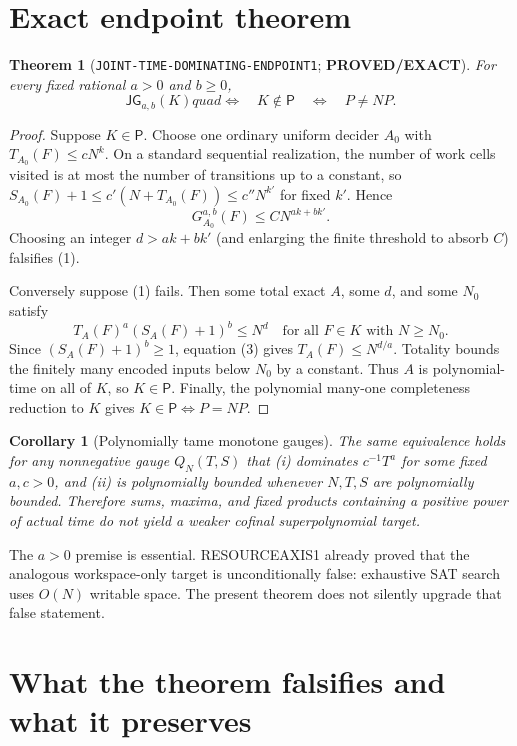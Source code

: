 \documentclass[11pt]{article}
\newtheorem{theorem}{Theorem}
\newtheorem{corollary}{Corollary}
\newcommand{\EXACT}{\textbf{PROVED/EXACT}}
\begin{document}
\section{Exact endpoint theorem}

\begin{theorem}[\texttt{JOINT-TIME-DOMINATING-ENDPOINT1}; \EXACT]
For every fixed rational $a>0$ and $b\ge0$,
\[
 \mathsf{JG}_{a,b}(K)quad\Longleftrightarrow\quad K\notin\mathsf P
 \quad\Longleftrightarrow\quad P\ne NP.                 \tag{2}
\]
\end{theorem}

\begin{proof}
Suppose $K\in\mathsf P$.  Choose one ordinary uniform decider $A_0$ with
$T_{A_0}(F)\le cN^k$.  On a standard sequential realization, the number of
work cells visited is at most the number of transitions up to a constant, so
$S_{A_0}(F)+1\le c'(N+T_{A_0}(F))\le c''N^{k'}$ for fixed $k'$.  Hence
\[
 G^{a,b}_{A_0}(F)\le C N^{ak+bk'}.
\]
Choosing an integer $d>ak+bk'$ (and enlarging the finite threshold to absorb
$C$) falsifies (1).

Conversely suppose (1) fails.  Then some total exact $A$, some $d$, and some
$N_0$ satisfy
\[
 T_A(F)^a(S_A(F)+1)^b\le N^d
 \quad\text{for all }F\in K\text{ with }N\ge N_0.       \tag{3}
\]
Since $(S_A(F)+1)^b\ge1$, equation (3) gives
$T_A(F)\le N^{d/a}$.  Totality bounds the finitely many encoded inputs below
$N_0$ by a constant.  Thus $A$ is polynomial-time on all of $K$, so
$K\in\mathsf P$.  Finally, the polynomial many-one completeness reduction to
$K$ gives $K\in\mathsf P\Longleftrightarrow P=NP$.
\end{proof}

\begin{corollary}[Polynomially tame monotone gauges]
The same equivalence holds for any nonnegative gauge $Q_N(T,S)$ that (i)
dominates $c^{-1}T^a$ for some fixed $a,c>0$, and (ii) is polynomially bounded
whenever $N,T,S$ are polynomially bounded.  Therefore sums, maxima, and fixed
products containing a positive power of actual time do not yield a weaker
cofinal superpolynomial target.
\end{corollary}

The $a>0$ premise is essential.  RESOURCEAXIS1 already proved that the
analogous workspace-only target is unconditionally false: exhaustive SAT
search uses $O(N)$ writable space.  The present theorem does not silently
upgrade that false statement.

\section{What the theorem falsifies and what it preserves}
\end{document}
